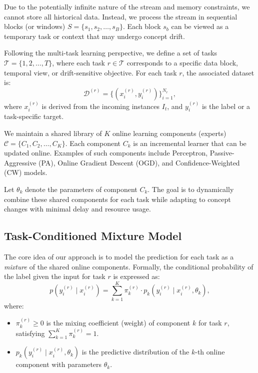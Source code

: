 \documentclass[12pt,a4paper]{article}
\begin{document}
Due to the potentially infinite nature of the stream and memory constraints, we cannot store all historical data. Instead, we process the stream in sequential blocks (or windows) $S = \{s_1, s_2, \dots, s_B\}$. Each block $s_b$ can be viewed as a temporary task or context that may undergo concept drift.

Following the multi-task learning perspective, we define a set of tasks $\mathcal{T} = \{1, 2, \dots, T\}$, where each task $r \in \mathcal{T}$ corresponds to a specific data block, temporal view, or drift-sensitive objective. For each task $r$, the associated dataset is:
\[
\mathcal{D}^{(r)} = \{(x_i^{(r)}, y_i^{(r)})\}_{i=1}^{N_r},
\]
where $x_i^{(r)}$ is derived from the incoming instances $I_t$, and $y_i^{(r)}$ is the label or a task-specific target.

We maintain a shared library of $K$ online learning components (experts) $\mathcal{C} = \{C_1, C_2, \dots, C_K\}$. Each component $C_k$ is an incremental learner that can be updated online. Examples of such components include Perceptron, Passive-Aggressive (PA), Online Gradient Descent (OGD), and Confidence-Weighted (CW) models. 

Let $\theta_k$ denote the parameters of component $C_k$. The goal is to dynamically combine these shared components for each task while adapting to concept changes with minimal delay and resource usage.

	
	
	
	
	
	
\subsection{Task-Conditioned Mixture Model}

The core idea of our approach is to model the prediction for each task as a \emph{mixture} of the shared online components. Formally, the conditional probability of the label given the input for task $r$ is expressed as:
\begin{equation}
	p\left(y_i^{(r)} \mid x_i^{(r)}\right) = \sum_{k=1}^K \pi_k^{(r)} \cdot p_k\left(y_i^{(r)} \mid x_i^{(r)}, \theta_k\right),
	\label{eq:mixture_model}
\end{equation}
where:
\begin{itemize}
	\item $\pi_k^{(r)} \geq 0$ is the mixing coefficient (weight) of component $k$ for task $r$, satisfying $\sum_{k=1}^K \pi_k^{(r)} = 1$.
	\item $p_k\left(y_i^{(r)} \mid x_i^{(r)}, \theta_k\right)$ is the predictive distribution of the $k$-th online component with parameters $\theta_k$.
\end{itemize}
\end{document}
